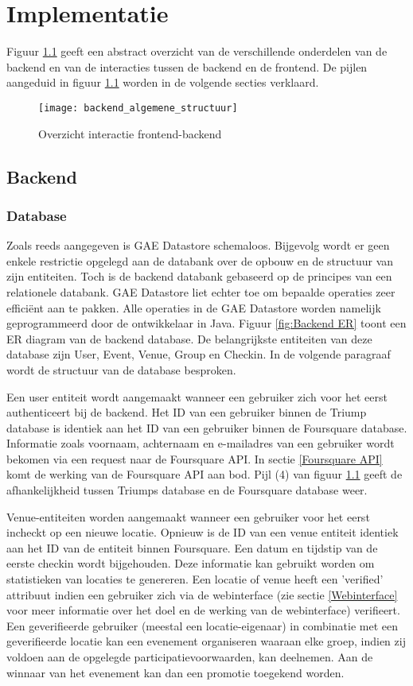 \chapter{Implementatie}
Figuur \ref{fig:algemene structuur backend} geeft een abstract overzicht van de verschillende onderdelen van de backend en van de interacties tussen de backend en de frontend. De pijlen aangeduid in figuur \ref{fig:algemene structuur backend} worden in de volgende secties verklaard.

\begin{figure}[H]
	\centering
	\texttt{[image: backend\_algemene\_structuur]}
	\caption{Overzicht interactie frontend-backend}
	\label{fig:algemene structuur backend}
	
\end{figure}
\section{Backend}
\subsection{Database}
Zoals reeds aangegeven is GAE Datastore schemaloos. Bijgevolg wordt er geen enkele restrictie opgelegd aan de databank over de opbouw en de structuur van zijn entiteiten. Toch is de backend databank gebaseerd op de principes van een relationele databank. GAE Datastore liet echter toe om bepaalde operaties zeer efficiënt aan te pakken. Alle operaties in de GAE Datastore worden namelijk geprogrammeerd door de ontwikkelaar in Java.
Figuur \ref{fig:Backend ER} toont een ER diagram van de backend database.  De belangrijkste entiteiten van deze database zijn User, Event, Venue, Group en Checkin. In de volgende paragraaf wordt de structuur van de database besproken. 

Een user entiteit wordt aangemaakt wanneer een gebruiker zich voor het eerst authenticeert bij de backend. Het ID van een gebruiker binnen de Triump database is identiek aan het ID van een gebruiker binnen de Foursquare database. Informatie zoals voornaam, achternaam en e-mailadres van een gebruiker wordt bekomen via een request naar de Foursquare API. In sectie \ref{Foursquare API} komt de werking van de Foursquare API aan bod. Pijl (4) van figuur \ref{fig:algemene structuur backend} geeft de afhankelijkheid tussen Triumps database en de Foursquare database weer.

Venue-entiteiten worden aangemaakt wanneer een gebruiker voor het eerst incheckt op een nieuwe locatie. Opnieuw is de ID van een venue entiteit identiek aan het ID van de entiteit binnen Foursquare. Een datum en tijdstip van de eerste checkin wordt bijgehouden. Deze informatie kan gebruikt worden om statistieken van locaties te genereren. Een locatie of venue heeft een 'verified' attribuut indien een gebruiker zich via de webinterface (zie sectie \ref{Webinterface} voor meer informatie over het doel en de werking van de webinterface) verifieert. Een geverifieerde gebruiker (meestal een locatie-eigenaar) in combinatie met een geverifieerde locatie kan een evenement organiseren waaraan elke groep, indien zij voldoen aan de opgelegde participatievoorwaarden, kan deelnemen. Aan de winnaar van het evenement kan dan een promotie toegekend worden.

